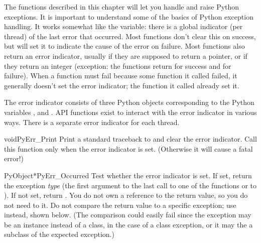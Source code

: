 \documentclass{manual}
\begin{document}
The functions described in this chapter will let you handle and raise Python
exceptions.  It is important to understand some of the basics of
Python exception handling.  It works somewhat like the
\UNIX{}  variable: there is a global indicator (per
thread) of the last error that occurred.  Most functions don't clear
this on success, but will set it to indicate the cause of the error on
failure.  Most functions also return an error indicator, usually
\NULL{} if they are supposed to return a pointer, or  if they
return an integer (exception: the  functions
return  for success and  for failure).  When a
function must fail because some function it called failed, it
generally doesn't set the error indicator; the function it called
already set it.

The error indicator consists of three Python objects corresponding to
the Python variables ,  and
.  API functions exist to interact with the
error indicator in various ways.  There is a separate error indicator
for each thread.


\begin{cfuncdesc}{void}{PyErr_Print}{}
Print a standard traceback to  and clear the error
indicator.  Call this function only when the error indicator is set.
(Otherwise it will cause a fatal error!)
\end{cfuncdesc}

\begin{cfuncdesc}{PyObject*}{PyErr_Occurred}{}
Test whether the error indicator is set.  If set, return the exception
\emph{type} (the first argument to the last call to one of the
 functions or to ).  If
not set, return \NULL{}.  You do not own a reference to the return
value, so you do not need to  it.
  Do not compare the return value to a specific
exception; use  instead, shown
below.  (The comparison could easily fail since the exception may be
an instance instead of a class, in the case of a class exception, or
it may the a subclass of the expected exception.)
\end{cfuncdesc}
\end{document}
